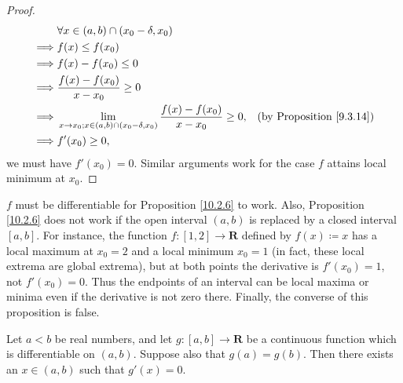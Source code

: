 \begin{proof}
\begin{align*}
                 & \forall x \in (a, b) \cap (x_0 - \delta, x_0)                                                                                         \\
        \implies & f(x) \leq f(x_0)                                                                                                                      \\
        \implies & f(x) - f(x_0) \leq 0                                                                                                                  \\
        \implies & \frac{f(x) - f(x_0)}{x - x_0} \geq 0                                                                                                  \\
        \implies & \lim_{x \to x_0 ; x \in (a, b) \cap (x_0 - \delta, x_0)} \frac{f(x) - f(x_0)}{x - x_0} \geq 0, & \text{(by Proposition \ref{9.3.14})} \\
        \implies & f'(x_0) \geq 0,
    \end{align*}
    we must have \(f'(x_0) = 0\).
    Similar arguments work for the case \(f\) attains local minimum at \(x_0\).
\end{proof}

\begin{note}
    \(f\) must be differentiable for Proposition \ref{10.2.6} to work.
    Also, Proposition \ref{10.2.6} does not work if the open interval \((a, b)\) is replaced by a closed interval \([a, b]\).
    For instance, the function \(f : [1, 2] \to \mathbf{R}\) defined by \(f(x) \coloneqq x\) has a local maximum at \(x_0 = 2\) and a local minimum \(x_0 = 1\) (in fact, these local extrema are global extrema), but at both points the derivative is \(f'(x_0) = 1\), not \(f'(x_0) = 0\).
    Thus the endpoints of an interval can be local maxima or minima even if the derivative is not zero there.
    Finally, the converse of this proposition is false.
\end{note}

\begin{theorem}\label{10.2.7}
    Let \(a < b\) be real numbers, and let \(g : [a, b] \to \mathbf{R}\) be a continuous function which is differentiable on \((a, b)\).
    Suppose also that \(g(a) = g(b)\).
    Then there exists an \(x \in (a, b)\) such that \(g'(x) = 0\).
\end{theorem}

